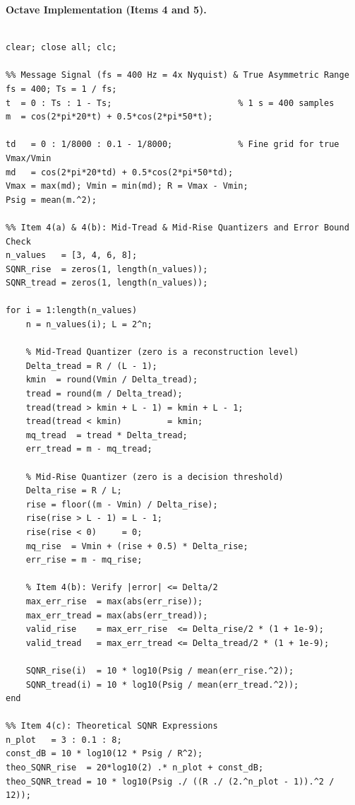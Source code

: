 \documentclass[a4paper]{article}
\begin{document}
\noindent\textbf{Octave Implementation (Items 4 and 5).}\par\smallskip
\begin{lstlisting}[basicstyle=\ttfamily\scriptsize, breaklines=true, breakatwhitespace=true, frame=single, xleftmargin=6pt, xrightmargin=6pt, framexleftmargin=6pt, framexrightmargin=6pt, aboveskip=4pt, belowskip=6pt]

clear; close all; clc;

%% Message Signal (fs = 400 Hz = 4x Nyquist) & True Asymmetric Range
fs = 400; Ts = 1 / fs;
t  = 0 : Ts : 1 - Ts;                         % 1 s = 400 samples
m  = cos(2*pi*20*t) + 0.5*cos(2*pi*50*t);

td   = 0 : 1/8000 : 0.1 - 1/8000;             % Fine grid for true Vmax/Vmin
md   = cos(2*pi*20*td) + 0.5*cos(2*pi*50*td);
Vmax = max(md); Vmin = min(md); R = Vmax - Vmin;
Psig = mean(m.^2);

%% Item 4(a) & 4(b): Mid-Tread & Mid-Rise Quantizers and Error Bound Check
n_values   = [3, 4, 6, 8];
SQNR_rise  = zeros(1, length(n_values));
SQNR_tread = zeros(1, length(n_values));

for i = 1:length(n_values)
    n = n_values(i); L = 2^n;

    % Mid-Tread Quantizer (zero is a reconstruction level)
    Delta_tread = R / (L - 1);
    kmin  = round(Vmin / Delta_tread);
    tread = round(m / Delta_tread);
    tread(tread > kmin + L - 1) = kmin + L - 1;
    tread(tread < kmin)         = kmin;
    mq_tread  = tread * Delta_tread;
    err_tread = m - mq_tread;

    % Mid-Rise Quantizer (zero is a decision threshold)
    Delta_rise = R / L;
    rise = floor((m - Vmin) / Delta_rise);
    rise(rise > L - 1) = L - 1;
    rise(rise < 0)     = 0;
    mq_rise  = Vmin + (rise + 0.5) * Delta_rise;
    err_rise = m - mq_rise;

    % Item 4(b): Verify |error| <= Delta/2
    max_err_rise  = max(abs(err_rise));
    max_err_tread = max(abs(err_tread));
    valid_rise    = max_err_rise  <= Delta_rise/2 * (1 + 1e-9);
    valid_tread   = max_err_tread <= Delta_tread/2 * (1 + 1e-9);

    SQNR_rise(i)  = 10 * log10(Psig / mean(err_rise.^2));
    SQNR_tread(i) = 10 * log10(Psig / mean(err_tread.^2));
end

%% Item 4(c): Theoretical SQNR Expressions
n_plot   = 3 : 0.1 : 8;
const_dB = 10 * log10(12 * Psig / R^2);
theo_SQNR_rise  = 20*log10(2) .* n_plot + const_dB;
theo_SQNR_tread = 10 * log10(Psig ./ ((R ./ (2.^n_plot - 1)).^2 / 12));


\end{lstlisting}
\end{document}
